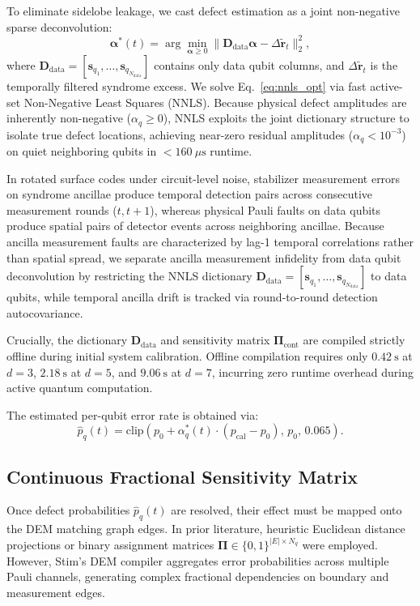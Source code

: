 \documentclass[aps,prxquantum,reprint,superscriptaddress,floatfix,nofootinbib]{revtex4-2}
\begin{document}
To eliminate sidelobe leakage, we cast defect estimation as a joint non-negative sparse deconvolution:
\begin{equation}
    \boldsymbol{\alpha}^*(t) = \arg\min_{\boldsymbol{\alpha} \ge 0} \|\mathbf{D}_{\text{data}} \boldsymbol{\alpha} - \Delta \tilde{\mathbf{r}}_t\|_2^2,
    \label{eq:nnls_opt}
\end{equation}
where $\mathbf{D}_{\text{data}} = [\mathbf{s}_{q_1}, \dots, \mathbf{s}_{q_{N_{\text{data}}}}]$ contains only data qubit columns, and $\Delta \tilde{\mathbf{r}}_t$ is the temporally filtered syndrome excess. We solve Eq.~\eqref{eq:nnls_opt} via fast active-set Non-Negative Least Squares (\textsc{NNLS}). Because physical defect amplitudes are inherently non-negative ($\alpha_q \ge 0$), NNLS exploits the joint dictionary structure to isolate true defect locations, achieving near-zero residual amplitudes ($\alpha_q < 10^{-3}$) on quiet neighboring qubits in $<160\ \mu\text{s}$ runtime.

In rotated surface codes under circuit-level noise, stabilizer measurement errors on syndrome ancillae produce temporal detection pairs across consecutive measurement rounds ($t, t+1$), whereas physical Pauli faults on data qubits produce spatial pairs of detector events across neighboring ancillae. Because ancilla measurement faults are characterized by lag-1 temporal correlations rather than spatial spread, we separate ancilla measurement infidelity from data qubit deconvolution by restricting the NNLS dictionary $\mathbf{D}_{\text{data}} = [\mathbf{s}_{q_1}, \dots, \mathbf{s}_{q_{N_{\text{data}}}}]$ to data qubits, while temporal ancilla drift is tracked via round-to-round detection autocovariance.

Crucially, the dictionary $\mathbf{D}_{\text{data}}$ and sensitivity matrix $\mathbf{\Pi}_{\text{cont}}$ are compiled strictly offline during initial system calibration. Offline compilation requires only $0.42\ \text{s}$ at $d=3$, $2.18\ \text{s}$ at $d=5$, and $9.06\ \text{s}$ at $d=7$, incurring zero runtime overhead during active quantum computation.

The estimated per-qubit error rate is obtained via:
\begin{equation}
    \hat{p}_q(t) = \text{clip}\left( p_0 + \alpha_q^*(t) \cdot (p_{\text{cal}} - p_0), \, p_0, \, 0.065 \right).
    \label{eq:p_hat_def}
\end{equation}

\subsection{Continuous Fractional Sensitivity Matrix}
\label{subsec:sensitivity_matrix}
Once defect probabilities $\hat{p}_q(t)$ are resolved, their effect must be mapped onto the DEM matching graph edges. In prior literature, heuristic Euclidean distance projections or binary assignment matrices $\mathbf{\Pi} \in \{0, 1\}^{|E| \times N_q}$ were employed. However, Stim's DEM compiler aggregates error probabilities across multiple Pauli channels, generating complex fractional dependencies on boundary and measurement edges.
\end{document}
